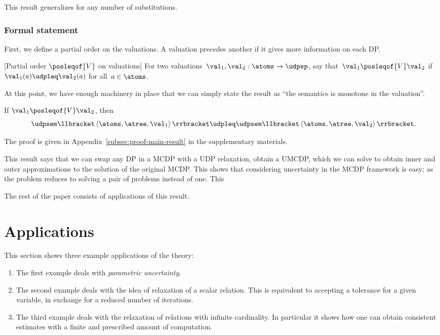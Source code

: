 This result generalizes for any number of substitutions.

\subsubsection*{Formal statement}

First, we define a partial order on the valuations.
A valuation precedes
another if it gives more information on each DP.
\begin{definition}
	\label{def:For-two-valuations}
	[Partial order $\posleqof{V}$ on valuations]
	For two valuations~$\val_{1},\val_{2}:\atoms\rightarrow\udpsp$,
	say that~$\val_{1}\posleqof{V}\val_{2}$ if~$\val_{1}(a)\udpleq\val_{2}(a)$
	for all~$a\in\atoms$.
\end{definition}
At this point, we have enough machinery in place that we can simply
state the result as ``the semantics is monotone in the valuation''.
\begin{theorem}
	\label{thm:udpsem-monotone}
	If $\val_{1}\posleqof{V}\val_{2}$, then
	\[
		\udpsem\llbracket\left\langle \atoms,\atree,\val_{1}\right\rangle \rrbracket\udpleq\udpsem\llbracket\left\langle \atoms,\atree,\val_{2}\right\rangle \rrbracket.
	\]
\end{theorem}
The proof is given in Appendix~\cref{subsec:proof-main-result}
in the supplementary materials.

This result says that we can swap any DP in a MCDP with a UDP relaxation,
obtain a UMCDP, which we can solve to obtain inner and outer approximations
to the solution of the original MCDP.
This shows that considering
uncertainty in the MCDP framework is easy; as the problem reduces
to solving a pair of problems instead of one.
This

The rest of the paper consists of applications of this result.

\section{Applications\label{sec:Applications}}

This section shows three example applications of the theory:
\begin{enumerate}
	\item The first example deals with \emph{parametric uncertainty}.
	\item The second example deals with the idea of relaxation of a scalar relation.
	      This is equivalent to accepting a tolerance for a given variable,
	      in exchange for a reduced number of iterations.
	\item The third example deals with the relaxation of relations with infinite
	      cardinality.
	      In particular it shows how one can obtain consistent
	      estimates with a finite and prescribed amount of computation.
\end{enumerate}

